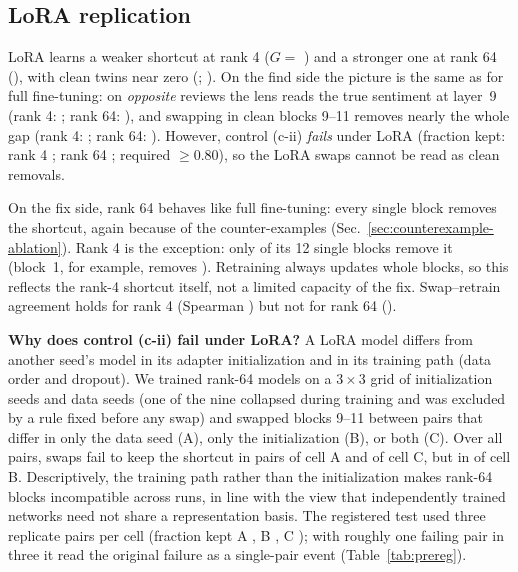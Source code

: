 \subsection{LoRA replication}
\label{sec:lora}
LoRA learns a weaker shortcut at rank 4 ($G =$ \gapLoraRFour) and a stronger one at rank 64 (\gapLoraRSixtyFour), with
clean twins near zero (\gapLoraRFourClean; \gapLoraRSixtyFourClean). On the find side the picture is the same as for
full fine-tuning: on \emph{opposite} reviews the lens reads the true sentiment at layer~9 (rank 4: \lensCalOppLNineLoraRFour;
rank 64: \lensCalOppLNineLoraRSixtyFour), and swapping in clean blocks 9--11 removes nearly the whole gap (rank 4:
\swapARemovedLateLoraRFour; rank 64: \swapARemovedLateLoraRSixtyFour). However, control (c-ii) \emph{fails} under LoRA
(fraction kept: rank 4 \swapCiiKeptLateLoraRFour; rank 64 \swapCiiKeptLateLoraRSixtyFour; required $\ge 0.80$), so the
LoRA swaps cannot be read as clean removals.

On the fix side, rank 64 behaves like full fine-tuning: every single block removes the shortcut, again because of the
counter-examples (Sec.~\ref{sec:counterexample-ablation}). Rank 4 is the exception: only \ccPassWithNamesLoraRFour{} of
its 12 single blocks remove it (block~1, for example, removes \retrainRemovedBOneLoraRFour). Retraining always updates
whole blocks, so this reflects the rank-4 shortcut itself, not a limited capacity of the fix. Swap--retrain agreement
holds for rank 4 (Spearman \spearmanSwapRetrainLoraRFour) but not for rank 64 (\spearmanSwapRetrainLoraRSixtyFour).

\textbf{Why does control (c-ii) fail under LoRA?} A LoRA model differs from another seed's model in its adapter
initialization and in its training path (data order and dropout). We trained rank-64 models on a $3\times3$ grid of
initialization seeds and data seeds (one of the nine collapsed during training and was excluded by a rule fixed before
any swap) and swapped blocks 9--11 between pairs that differ in only the data seed (A), only the initialization (B), or
both (C). Over all pairs, swaps fail to keep the shortcut in \lFiveFailPairsCellA{} pairs of cell A and
\lFiveFailPairsCellC{} of cell C, but in \lFiveFailPairsCellB{} of cell B. Descriptively, the training path rather than
the initialization makes rank-64 blocks incompatible across runs, in line with the view that independently trained
networks need not share a representation basis. The registered test used three replicate pairs per cell (fraction kept
A \lFiveKeptCellA, B \lFiveKeptCellB, C \lFiveKeptCellC); with roughly one failing pair in three it read the original
failure as a single-pair event (Table~\ref{tab:prereg}).

